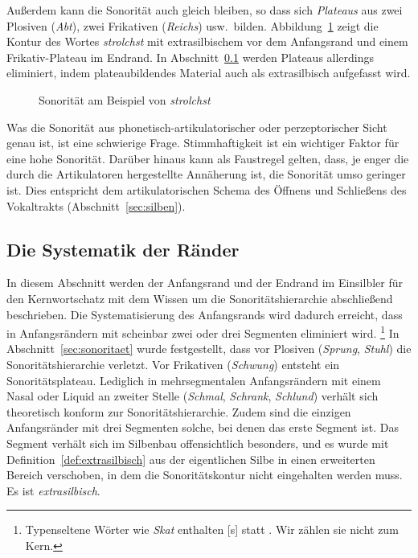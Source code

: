 Außerdem kann die Sonorität auch gleich bleiben, so dass sich \textit{Plateaus} aus zwei Plosiven (\textit{Abt}), zwei Frikativen (\textit{Reichs}) usw.\ bilden.
Abbildung~\ref{fig:sonoritaet102} zeigt die Kontur des Wortes \textit{strolchst} mit extrasilbischem \textipa{[S]} vor dem Anfangsrand und einem Frikativ-Plateau im Endrand.
In Abschnitt~\ref{sec:diesystematikderraender} werden Plateaus allerdings eliminiert, indem plateaubildendes Material auch als extrasilbisch aufgefasst wird.

\begin{figure}[!htbp]
  \centering
  \caption{Sonorität am Beispiel von \textit{strolchst}}
  \label{fig:sonoritaet102}
\end{figure}

Was die Sonorität aus phonetisch-artikulatorischer oder perzeptorischer Sicht genau ist, ist eine schwierige Frage.
Stimmhaftigkeit ist ein wichtiger Faktor für eine hohe Sonorität.
Darüber hinaus kann als Faustregel gelten, dass, je enger die durch die Artikulatoren hergestellte Annäherung ist, die Sonorität umso geringer ist.
Dies entspricht dem artikulatorischen Schema des Öffnens und Schließens des Vokaltrakts (Abschnitt~\ref{sec:silben}).

\subsection{Die Systematik der Ränder}
\label{sec:diesystematikderraender}


In diesem Abschnitt werden der Anfangsrand und der Endrand im Einsilbler für den Kernwortschatz mit dem Wissen um die Sonoritätshierarchie abschließend beschrieben.
Die Systematisierung des Anfangsrands wird dadurch erreicht, dass \textipa{[S]} in Anfangsrändern mit scheinbar zwei oder drei Segmenten eliminiert wird.%
\footnote{Typenseltene Wörter wie \textit{Skat} enthalten [s] statt \textipa{[S]}.
Wir zählen sie nicht zum Kern.}
In Abschnitt~\ref{sec:sonoritaet} wurde festgestellt, dass \textipa{[S]} vor Plosiven (\textit{Sprung}, \textit{Stuhl}) die Sonoritätshierarchie verletzt.
Vor Frikativen (\textit{Schwung}) entsteht ein Sonoritätsplateau.
Lediglich in mehrsegmentalen Anfangsrändern mit einem Nasal oder Liquid an zweiter Stelle (\textit{Schmal}, \textit{Schrank}, \textit{Schlund}) verhält sich \textipa{[S]} theoretisch konform zur Sonoritätshierarchie.
Zudem sind die einzigen Anfangsränder mit drei Segmenten solche, bei denen das erste Segment \textipa{[S]} ist.
Das Segment \textipa{[S]} verhält sich im Silbenbau offensichtlich besonders, und es wurde mit Definition~\ref{def:extrasilbisch} aus der eigentlichen Silbe in einen erweiterten Bereich verschoben, in dem die Sonoritätskontur nicht eingehalten werden muss.
Es ist \textit{extrasilbisch}.

